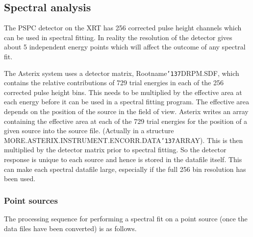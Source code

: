 \documentclass{book}
\renewcommand{\_}{{\tt\char'137}}     %
\begin{document}
\subsection{Spectral analysis}
The PSPC detector on the XRT has 256 corrected pulse height channels
which can be used in spectral fitting. In reality the resolution of
the detector gives about 5 independent energy points which will affect
the outcome of any spectral fit.

The Asterix system uses a detector matrix, Rootname\_DRPM.SDF, which
contains the relative contributions of 729 trial energies in each
of the 256 corrected pulse height bins. This needs to be multiplied
by the effective area at each energy before it can be used in a
spectral fitting program. The effective area depends on the position
of the source in the field of view. Asterix writes an array containing
the effective area at each of the 729 trial energies for the position
of a given source into the source file. (Actually in a structure
MORE.ASTERIX.INSTRUMENT.ENCORR.DATA\_ARRAY). This is then multiplied by
the detector matrix prior to spectral fitting. So the detector response
is unique to each source and hence is stored in the datafile itself.
This can make each spectral datafile large, especially if the full 256
bin resolution has been used.

\subsubsection{Point sources}
The processing sequence for performing a spectral fit on a point
source (once the data files have been converted) is as follows.
\end{document}
